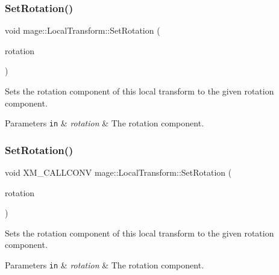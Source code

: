 \subsubsection{\texorpdfstring{Set\+Rotation()}{SetRotation()}\hspace{0.1cm}{\footnotesize\ttfamily [2/3]}}
{\footnotesize\ttfamily void mage\+::\+Local\+Transform\+::\+Set\+Rotation (\begin{DoxyParamCaption}\item[{\mbox{\hyperlink{namespacemage_a0fef5ab4e073c2d9ea876fefa3da4233}{F32x3}}}]{rotation }\end{DoxyParamCaption})\hspace{0.3cm}{\ttfamily [noexcept]}}

Sets the rotation component of this local transform to the given rotation component.


\begin{DoxyParams}[1]{Parameters}
\mbox{\tt in}  & {\em rotation} & The rotation component. \\
\hline
\end{DoxyParams}
\mbox{\label{classmage_1_1_local_transform_a470961f6e4f3b0920742489722ca791e}} 
\subsubsection{\texorpdfstring{Set\+Rotation()}{SetRotation()}\hspace{0.1cm}{\footnotesize\ttfamily [3/3]}}
{\footnotesize\ttfamily void X\+M\+\_\+\+C\+A\+L\+L\+C\+O\+NV mage\+::\+Local\+Transform\+::\+Set\+Rotation (\begin{DoxyParamCaption}\item[{F\+X\+M\+V\+E\+C\+T\+OR}]{rotation }\end{DoxyParamCaption})\hspace{0.3cm}{\ttfamily [noexcept]}}

Sets the rotation component of this local transform to the given rotation component.


\begin{DoxyParams}[1]{Parameters}
\mbox{\tt in}  & {\em rotation} & The rotation component. \\
\hline
\end{DoxyParams}
\mbox{\label{classmage_1_1_local_transform_a366b1cbd069bce035a868a8800dc04e9}} 
